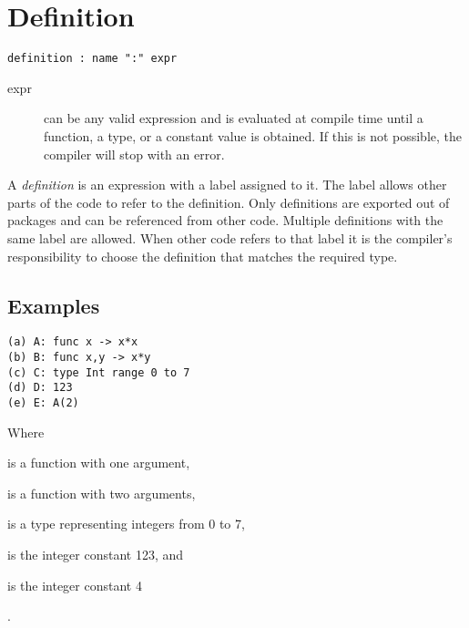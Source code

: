 \section{Definition}

\begin{lstlisting}[language=EBNF]
definition : name ":" expr
\end{lstlisting}

\begin{description}
\item[expr] can be any valid expression and is evaluated at compile time until a
            function, a type, or a constant value is obtained. If this is not
            possible, the compiler will stop with an error.
\end{description}

A \emph{definition} is an expression with a label assigned to it. The label
allows other parts of the code to refer to the definition. Only definitions are
exported out of packages and can be referenced from other code. Multiple
definitions with the same label are allowed. When other code refers to that
label it is the compiler's responsibility to choose the definition that matches
the required type.

\subsection{Examples}
\begin{lstlisting}
(a) A: func x -> x*x
(b) B: func x,y -> x*y
(c) C: type Int range 0 to 7
(d) D: 123
(e) E: A(2)
\end{lstlisting}

Where \begin{exdesc}
	\item is a function with one argument,
	\item is a function with two arguments,
	\item is a type representing integers from 0 to 7,
	\item is the integer constant 123, and
	\item is the integer constant 4
\end{exdesc}.
